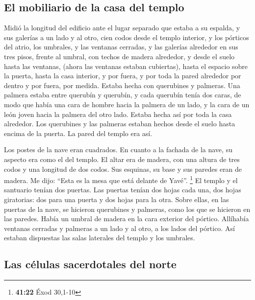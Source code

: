 \hypertarget{el-mobiliario-de-la-casa-del-templo}{%
\subsection{El mobiliario de la casa del
templo}\label{el-mobiliario-de-la-casa-del-templo}}

 Midió la longitud del edificio ante el lugar separado
que estaba a su espalda, y sus galerías a un lado y al otro, cien codos
desde el templo interior, y los pórticos del atrio,  los
umbrales, y las ventanas cerradas, y las galerías alrededor en sus tres
pisos, frente al umbral, con techos de madera alrededor, y desde el
suelo hasta las ventanas, (ahora las ventanas estaban cubiertas),
 hasta el espacio sobre la puerta, hasta la casa
interior, y por fuera, y por toda la pared alrededor por dentro y por
fuera, por medida.  Estaba hecha con querubines y
palmeras. Una palmera estaba entre querubín y querubín, y cada querubín
tenía dos caras,  de modo que había una cara de hombre
hacia la palmera de un lado, y la cara de un león joven hacia la palmera
del otro lado. Estaba hecha así por toda la casa alrededor.
 Los querubines y las palmeras estaban hechos desde el
suelo hasta encima de la puerta. La pared del templo era así.

 Los postes de la nave eran cuadrados. En cuanto a la
fachada de la nave, su aspecto era como el del templo. 
El altar era de madera, con una altura de tres codos y una longitud de
dos codos. Sus esquinas, su base y sus paredes eran de madera. Me dijo:
``Esta es la mesa que está delante de Yavé''. \footnote{\textbf{41:22}
  Éxod 30,1-10}  El templo y el santuario tenían dos
puertas.  Las puertas tenían dos hojas cada una, dos
hojas giratorias: dos para una puerta y dos hojas para la otra.
 Sobre ellas, en las puertas de la nave, se hicieron
querubines y palmeras, como los que se hicieron en las paredes. Había un
umbral de madera en la cara exterior del pórtico. 
Allíhabía ventanas cerradas y palmeras a un lado y al otro, a los lados
del pórtico. Así estaban dispuestas las salas laterales del templo y los
umbrales.

\hypertarget{las-cuxe9lulas-sacerdotales-del-norte}{%
\subsection{Las células sacerdotales del
norte}\label{las-cuxe9lulas-sacerdotales-del-norte}}

